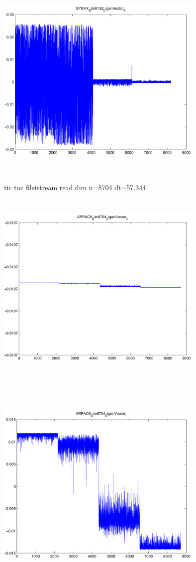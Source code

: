 \documentclass[9pt]{article}
\theoremstyle{plain}
\theoremstyle{definition}
\theoremstyle{remark}
\numberwithin{equation}{section}
\begin{document}
\includegraphics[width=10.0cm,height=10.0cm]{SYEVX_Dim8192_EigenVector_4.pdf}

tic toc fileistream read dim n=8704 dt=57.344
\includegraphics[width=10.0cm,height=10.0cm]{ARPACK_Dim8704_EigenVector_0.pdf}

\includegraphics[width=10.0cm,height=10.0cm]{ARPACK_Dim8704_EigenVector_1.pdf}
\end{document}
